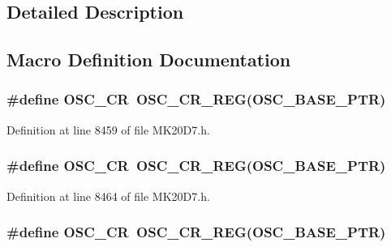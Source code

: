 \subsection{Detailed Description}


\subsection{Macro Definition Documentation}
\subsubsection[{\texorpdfstring{O\+S\+C\+\_\+\+CR}{OSC_CR}}]{\setlength{\rightskip}{0pt plus 5cm}\#define O\+S\+C\+\_\+\+CR~{\bf O\+S\+C\+\_\+\+C\+R\+\_\+\+R\+EG}({\bf O\+S\+C\+\_\+\+B\+A\+S\+E\+\_\+\+P\+TR})}\hypertarget{group___o_s_c___register___accessor___macros_ga4361def829ba760e782fbd2f74eb0e19}{}\label{group___o_s_c___register___accessor___macros_ga4361def829ba760e782fbd2f74eb0e19}


Definition at line 8459 of file M\+K20\+D7.\+h.

\subsubsection[{\texorpdfstring{O\+S\+C\+\_\+\+CR}{OSC_CR}}]{\setlength{\rightskip}{0pt plus 5cm}\#define O\+S\+C\+\_\+\+CR~{\bf O\+S\+C\+\_\+\+C\+R\+\_\+\+R\+EG}({\bf O\+S\+C\+\_\+\+B\+A\+S\+E\+\_\+\+P\+TR})}\hypertarget{group___o_s_c___register___accessor___macros_ga4361def829ba760e782fbd2f74eb0e19}{}\label{group___o_s_c___register___accessor___macros_ga4361def829ba760e782fbd2f74eb0e19}


Definition at line 8464 of file M\+K20\+D7.\+h.

\subsubsection[{\texorpdfstring{O\+S\+C\+\_\+\+CR}{OSC_CR}}]{\setlength{\rightskip}{0pt plus 5cm}\#define O\+S\+C\+\_\+\+CR~{\bf O\+S\+C\+\_\+\+C\+R\+\_\+\+R\+EG}({\bf O\+S\+C\+\_\+\+B\+A\+S\+E\+\_\+\+P\+TR})}\hypertarget{group___o_s_c___register___accessor___macros_ga4361def829ba760e782fbd2f74eb0e19}{}\label{group___o_s_c___register___accessor___macros_ga4361def829ba760e782fbd2f74eb0e19}


